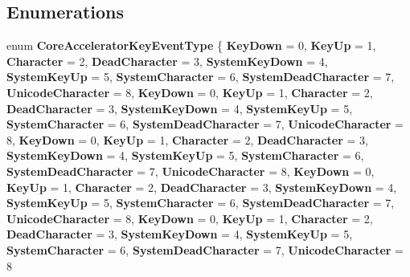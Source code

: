 \subsection*{Enumerations}
\begin{DoxyCompactItemize}
\item 
\mbox{\label{namespace_windows_1_1_u_i_1_1_core_a3b4a4c6a338426f7356d6fbe21e0541e}} 
enum {\bfseries Core\+Accelerator\+Key\+Event\+Type} \{ \newline
{\bfseries Key\+Down} = 0, 
{\bfseries Key\+Up} = 1, 
{\bfseries Character} = 2, 
{\bfseries Dead\+Character} = 3, 
\newline
{\bfseries System\+Key\+Down} = 4, 
{\bfseries System\+Key\+Up} = 5, 
{\bfseries System\+Character} = 6, 
{\bfseries System\+Dead\+Character} = 7, 
\newline
{\bfseries Unicode\+Character} = 8, 
{\bfseries Key\+Down} = 0, 
{\bfseries Key\+Up} = 1, 
{\bfseries Character} = 2, 
\newline
{\bfseries Dead\+Character} = 3, 
{\bfseries System\+Key\+Down} = 4, 
{\bfseries System\+Key\+Up} = 5, 
{\bfseries System\+Character} = 6, 
\newline
{\bfseries System\+Dead\+Character} = 7, 
{\bfseries Unicode\+Character} = 8, 
{\bfseries Key\+Down} = 0, 
{\bfseries Key\+Up} = 1, 
\newline
{\bfseries Character} = 2, 
{\bfseries Dead\+Character} = 3, 
{\bfseries System\+Key\+Down} = 4, 
{\bfseries System\+Key\+Up} = 5, 
\newline
{\bfseries System\+Character} = 6, 
{\bfseries System\+Dead\+Character} = 7, 
{\bfseries Unicode\+Character} = 8, 
{\bfseries Key\+Down} = 0, 
\newline
{\bfseries Key\+Up} = 1, 
{\bfseries Character} = 2, 
{\bfseries Dead\+Character} = 3, 
{\bfseries System\+Key\+Down} = 4, 
\newline
{\bfseries System\+Key\+Up} = 5, 
{\bfseries System\+Character} = 6, 
{\bfseries System\+Dead\+Character} = 7, 
{\bfseries Unicode\+Character} = 8, 
\newline
{\bfseries Key\+Down} = 0, 
{\bfseries Key\+Up} = 1, 
{\bfseries Character} = 2, 
{\bfseries Dead\+Character} = 3, 
\newline
{\bfseries System\+Key\+Down} = 4, 
{\bfseries System\+Key\+Up} = 5, 
{\bfseries System\+Character} = 6, 
{\bfseries System\+Dead\+Character} = 7, 
\newline
{\bfseries Unicode\+Character} = 8

\end{DoxyCompactItemize}
